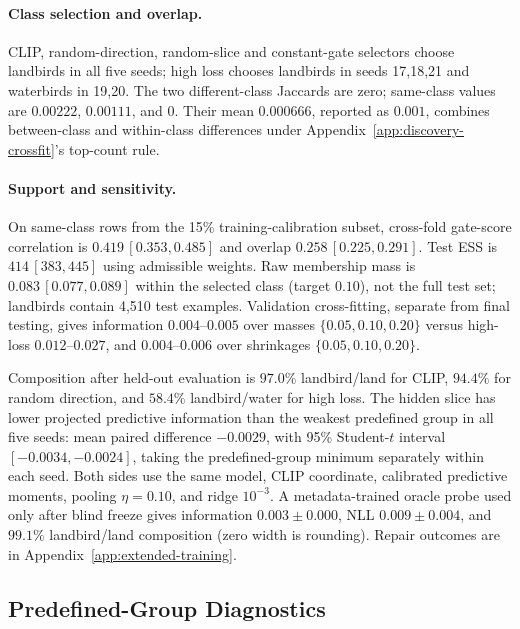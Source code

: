 \paragraph{Class selection and overlap.}
CLIP, random-direction, random-slice and constant-gate selectors choose landbirds in all five seeds; high loss chooses landbirds in seeds 17,18,21 and waterbirds in 19,20. The two different-class Jaccards are zero; same-class values are $0.00222$, $0.00111$, and $0$. Their mean $0.000666$, reported as $0.001$, combines between-class and within-class differences under Appendix~\ref{app:discovery-crossfit}'s top-count rule.

\paragraph{Support and sensitivity.}
On same-class rows from the 15\% training-calibration subset, cross-fold gate-score correlation is $0.419\,[0.353,0.485]$ and overlap $0.258\,[0.225,0.291]$. Test ESS is $414\,[383,445]$ using admissible weights. Raw membership mass is $0.083\,[0.077,0.089]$ within the selected class (target $0.10$), not the full test set; landbirds contain 4,510 test examples. Validation cross-fitting, separate from final testing, gives information $0.004$--$0.005$ over masses $\{0.05,0.10,0.20\}$ versus high-loss $0.012$--$0.027$, and $0.004$--$0.006$ over shrinkages $\{0.05,0.10,0.20\}$.

Composition after held-out evaluation is $97.0\%$ landbird/land for CLIP, $94.4\%$ for random direction, and $58.4\%$ landbird/water for high loss. The hidden slice has lower projected predictive information than the weakest predefined group in all five seeds: mean paired difference $-0.0029$, with 95\% Student-$t$ interval $[-0.0034,-0.0024]$, taking the predefined-group minimum separately within each seed. Both sides use the same model, CLIP coordinate, calibrated predictive moments, pooling $\eta=0.10$, and ridge $10^{-3}$. A metadata-trained oracle probe used only after blind freeze gives information $0.003\pm0.000$, NLL $0.009\pm0.004$, and $99.1\%$ landbird/land composition (zero width is rounding). Repair outcomes are in Appendix~\ref{app:extended-training}.

\FloatBarrier
\subsection{Predefined-Group Diagnostics}
\label{app:predefined-diagnostics}

